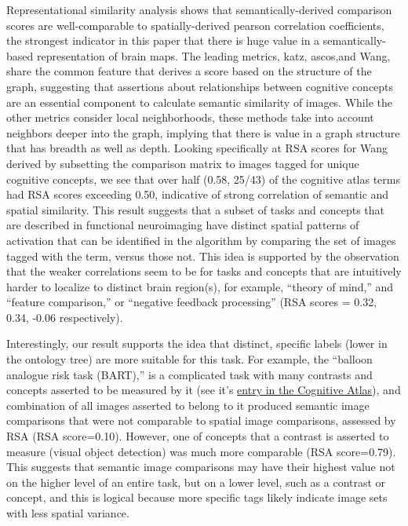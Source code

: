 \documentclass{report}
\begin{document}
Representational similarity analysis shows that semantically-derived
comparison scores are well-comparable to spatially-derived pearson
correlation coefficients, the strongest indicator in this paper that
there is huge value in a semantically-based representation of brain
maps. The leading metrics, katz, ascos,and Wang, share the common feature that derives a score based on the structure of the graph, suggesting that assertions about relationships between cognitive concepts are an essential component to calculate semantic similarity of images. While the other metrics consider local neighborhoods, these methods take into account neighbors deeper into the graph, implying that there is value in a graph structure that has breadth as well as depth. Looking specifically at RSA scores for Wang derived by subsetting the comparison matrix to images tagged for unique cognitive concepts, we see that over half (0.58, 25/43) of the cognitive atlas terms had RSA scores exceeding 0.50, indicative of strong correlation of semantic and
spatial similarity. This result suggests that a subset of tasks and
concepts that are described in functional neuroimaging have distinct
spatial patterns of activation that can be identified in the algorithm
by comparing the set of images tagged with the term, versus those not.
This idea is supported by the observation that the weaker correlations
seem to be for tasks and concepts that are intuitively harder to
localize to distinct brain region(s), for example, ``theory of mind,''
and ``feature comparison,'' or ``negative feedback processing'' (RSA
scores = 0.32, 0.34, -0.06 respectively).

Interestingly, our result supports the idea that distinct, specific
labels (lower in the ontology tree) are more suitable for this task. For
example, the ``balloon analogue risk task (BART),'' is a complicated
task with many contrasts and concepts asserted to be measured by it (see
it's
\href{http://www.cognitiveatlas.org/term/id/trm_4d559bcd67c18}{entry in the Cognitive Atlas}), and combination of all images asserted to
belong to it produced semantic image comparisons that were not
comparable to spatial image comparisons, assessed by RSA (RSA
score=0.10). However, one of concepts that a contrast is asserted to
measure (visual object detection) was much more comparable (RSA
score=0.79). This suggests that semantic image comparisons may have
their highest value not on the higher level of an entire task, but on a
lower level, such as a contrast or concept, and this is logical because
more specific tags likely indicate image sets with less spatial
variance.
\end{document}
